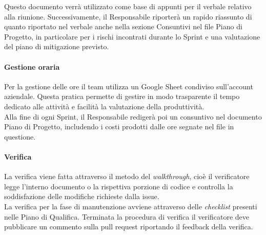         \noindent
        Questo documento verrà utilizzato come base di appunti per il verbale relativo alla riunione.
        Successivamente, il Responsabile riporterà un rapido riassunto di quanto riportato nel verbale anche nella sezione Consuntivi nel file Piano di Progetto, in particolare per i rischi incontrati durante lo Sprint e una valutazione del piano di mitigazione previsto.

        \paragraph{Gestione oraria}
        Per la gestione delle ore il team utilizza un Google Sheet condiviso sull'account aziendale. Questa pratica permette di gestire in modo trasparente il tempo dedicato alle attività e facilità la valutazione della produttività.\\
        Alla fine di ogni Sprint, il Responsabile redigerà poi un consuntivo nel documento Piano di Progetto, includendo i costi prodotti dalle ore segnate nel file in questione.

        \paragraph{Verifica} \label{sec:pian-verifica}
        La verifica viene fatta attraverso il metodo del \emph{walkthrough}, cioè il verificatore legge l'interno documento o la rispettiva porzione di codice e controlla la soddisfazione delle modifiche richieste dalla issue.\\
        La verifica per la fase di manutenzione avviene attraverso delle \emph{checklist} presenti nelle Piano di Qualifica. Terminata la procedura di verifica il verificatore deve pubblicare un commento sulla pull request riportando il feedback della verifica.
            
      
        